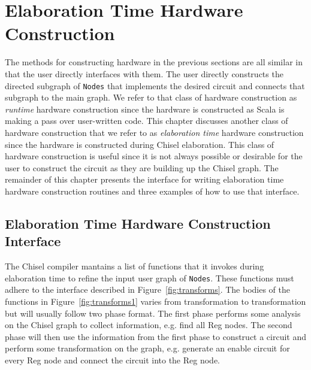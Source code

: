 \section{Elaboration Time Hardware Construction}
The methods for constructing hardware in the previous sections are all
similar in that the user directly interfaces with them. The user
directly constructs the directed subgraph of {\tt Nodes} that
implements the desired circuit and connects that subgraph to the main
graph. We refer to that class of hardware construction as 
{\it runtime} hardware construction since the hardware is
constructed as Scala is making a pass over user-written code. This
chapter discusses another class of hardware construction that we refer
to as {\it elaboration time} hardware construction since the
hardware is constructed during Chisel elaboration. This class of
hardware construction is useful since it is not always possible or
desirable for the user to construct the circuit as they are building
up the Chisel graph. The remainder of this chapter presents the
interface for writing elaboration time hardware construction routines
and three examples of how to use that interface.

\subsection{Elaboration Time Hardware Construction Interface}
The Chisel compiler mantains a list of functions that it invokes
during elaboration time to refine the input user graph of 
{\tt Nodes}. These functions must adhere to the interface described in
Figure~\ref{fig:transforms}. The bodies of the functions in
Figure~\ref{fig:transforms1} varies from transformation to
transformation but will usually follow two phase format. The first
phase performs some analysis on the Chisel graph to collect
information, e.g. find all Reg nodes. The second phase will then use
the information from the first phase to construct a circuit and
perform some transformation on the graph, e.g. generate an enable
circuit for every Reg node and connect the circuit into the Reg node.

